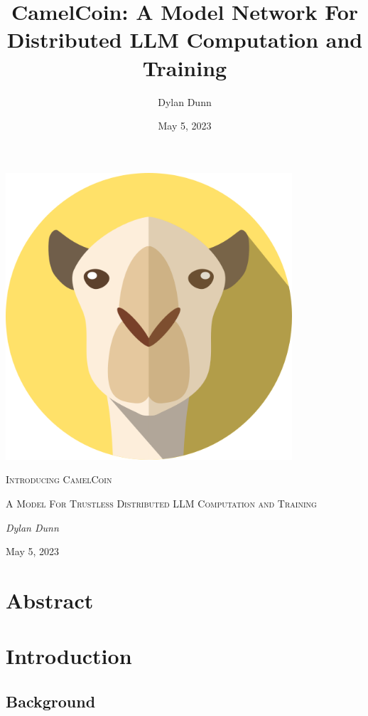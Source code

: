 \documentclass{article}
\title{CamelCoin: A Model Network For Distributed LLM Computation and Training}
\author{Dylan Dunn}
\date{May 5, 2023}
\begin{document}
\begin{titlepage}
    \centering
    \includegraphics[width=0.8\textwidth]{logo.png}\par\vspace{1cm}
    {\scshape\Large Introducing CamelCoin \par}
    \vspace{1cm}
    {\scshape\Large A Model For Trustless Distributed LLM Computation and Training\par}
    \vspace{2cm}
    {\Large\itshape Dylan Dunn\par}
    \vfill
    {\large May 5, 2023\par}
  \end{titlepage}
  

\section{Abstract}

\section{Introduction}
\subsection{Background}
\subsection{}
\end{document}
